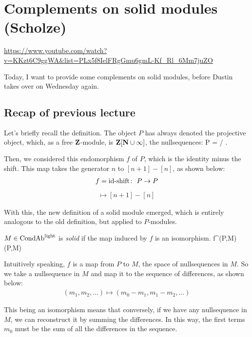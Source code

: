 
\section{\ufs Complements on solid modules (Scholze)}

\url{https://www.youtube.com/watch?v=KKzt6C9ggWA&list=PLx5f8IelFRgGmu6gmL-Kf_Rl_6Mm7juZO}
\renewcommand{\yt}[2]{\href{https://www.youtube.com/watch?v=KKzt6C9ggWA&list=PLx5f8IelFRgGmu6gmL-Kf_Rl_6Mm7juZO&t=#1}{#2}}
\vspace{1em}

Today, I want to provide some complements on solid modules, before Dustin takes over on Wednesday again.

\subsection{Recap of previous lecture}

Let's briefly recall the definition. The object $P$ has always denoted the projective object, which, as a free $\mathbf Z$-module, is $\mathbf Z[\mathbf N \cup \infty]$, the nullsequences:
\be
P = \Z[\N \cup \infty] / \Z[\infty].
\ee

Then, we considered this endomorphism $f$ of $P$, which is the identity minus the shift. This map takes the generator $n$ to $[n+1] - [n]$, as shown below:
\begin{align*}
f = \text{id-shift$\colon$ } P \to P
\end{align*}
\begin{align*}
[n] \mapsto [n+1] - [n]
\end{align*}

With this, the new definition of a solid module emerged, which is entirely analogous to the old definition, but applied to $P$-modules.

\bd[Solid]
$M \in \mathrm{Cond}\mathrm{Ab}^{\mathrm{light}}$ is \textit{solid} if the map induced by $f$ is an isomorphism.
\be
f^\ast \cl \IntHom(P,M) \iso \IntHom(P,M)
\ee

Intuitively speaking, $f$ is a map from $P$ to $M$, the space of nullsequences in $M$. So we take a nullsequence in $M$ and map it to the sequence of differences, as shown below:
\begin{align*}
(m_1, m_2, \ldots) \mapsto (m_0 - m_1, m_1 - m_2, \ldots)
\end{align*}
\ed

This being an isomorphism means that conversely, if we have any nullsequence in $M$, we can reconstruct it by summing the differences. In this way, the first terms $m_0$ must be the sum of all the differences in the sequence.

